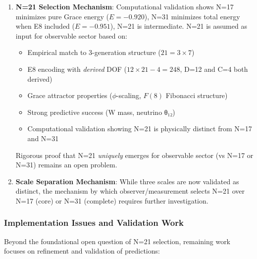 \documentclass[12pt,a4paper]{article}
\begin{document}
\begin{enumerate}
\item \textbf{N=21 Selection Mechanism}: Computational validation shows N=17 minimizes pure Grace energy ($E = -0.920$), N=31 minimizes total energy when E8 included ($E = -0.951$), N=21 is intermediate. N=21 is assumed as input for observable sector based on:
   \begin{itemize}
   \item Empirical match to 3-generation structure ($21 = 3 \times 7$)
   \item E8 encoding with \textit{derived} DOF ($12 \times 21 - 4 = 248$, D=12 and C=4 both derived)
   \item Grace attractor properties ($\phi$-scaling, $F(8)$ Fibonacci structure)
   \item Strong predictive success (W mass, neutrino θ₁₂)
   \item Computational validation showing N=21 is physically distinct from N=17 and N=31
   \end{itemize}
   Rigorous proof that N=21 \textit{uniquely} emerges for observable sector (vs N=17 or N=31) remains an open problem.

\item \textbf{Scale Separation Mechanism}: While three scales are now validated as distinct, the mechanism by which observer/measurement selects N=21 over N=17 (core) or N=31 (complete) requires further investigation.
\end{enumerate}

\subsubsection{Implementation Issues and Validation Work}

Beyond the foundational open question of N=21 selection, remaining work focuses on refinement and validation of predictions:
\end{document}
